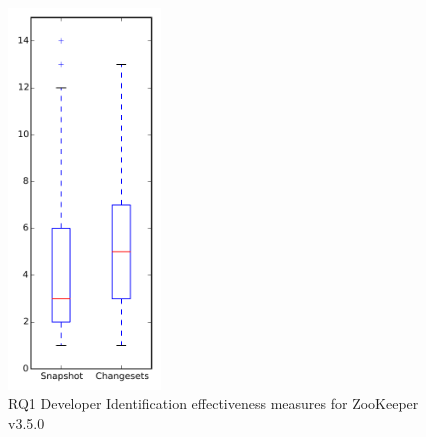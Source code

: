 
\begin{figure}[t]
\centering
\includegraphics[width=0.36\textwidth]{figures/dit/rq1_zookeeper}
\caption{RQ1 Developer Identification effectiveness measures for ZooKeeper v3.5.0}
\label{fig:dit:rq1:zookeeper}
\end{figure}
